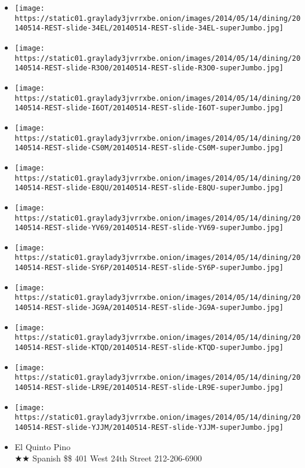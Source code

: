 \begin{itemize}
\item
  \texttt{[image: https://static01.graylady3jvrrxbe.onion/images/2014/05/14/dining/20140514-REST-slide-34EL/20140514-REST-slide-34EL-superJumbo.jpg]}
\item
  \texttt{[image: https://static01.graylady3jvrrxbe.onion/images/2014/05/14/dining/20140514-REST-slide-R3O0/20140514-REST-slide-R3O0-superJumbo.jpg]}
\item
  \texttt{[image: https://static01.graylady3jvrrxbe.onion/images/2014/05/14/dining/20140514-REST-slide-I6OT/20140514-REST-slide-I6OT-superJumbo.jpg]}
\item
  \texttt{[image: https://static01.graylady3jvrrxbe.onion/images/2014/05/14/dining/20140514-REST-slide-CS0M/20140514-REST-slide-CS0M-superJumbo.jpg]}
\item
  \texttt{[image: https://static01.graylady3jvrrxbe.onion/images/2014/05/14/dining/20140514-REST-slide-E8QU/20140514-REST-slide-E8QU-superJumbo.jpg]}
\item
  \texttt{[image: https://static01.graylady3jvrrxbe.onion/images/2014/05/14/dining/20140514-REST-slide-YV69/20140514-REST-slide-YV69-superJumbo.jpg]}
\item
  \texttt{[image: https://static01.graylady3jvrrxbe.onion/images/2014/05/14/dining/20140514-REST-slide-SY6P/20140514-REST-slide-SY6P-superJumbo.jpg]}
\item
  \texttt{[image: https://static01.graylady3jvrrxbe.onion/images/2014/05/14/dining/20140514-REST-slide-JG9A/20140514-REST-slide-JG9A-superJumbo.jpg]}
\item
  \texttt{[image: https://static01.graylady3jvrrxbe.onion/images/2014/05/14/dining/20140514-REST-slide-KTQD/20140514-REST-slide-KTQD-superJumbo.jpg]}
\item
  \texttt{[image: https://static01.graylady3jvrrxbe.onion/images/2014/05/14/dining/20140514-REST-slide-LR9E/20140514-REST-slide-LR9E-superJumbo.jpg]}
\item
  \texttt{[image: https://static01.graylady3jvrrxbe.onion/images/2014/05/14/dining/20140514-REST-slide-YJJM/20140514-REST-slide-YJJM-superJumbo.jpg]}
\end{itemize}

\begin{itemize}
\tightlist
\item
  El Quinto Pino\\
  ★★ Spanish \$\$ 401 West 24th Street 212-206-6900
\end{itemize}

